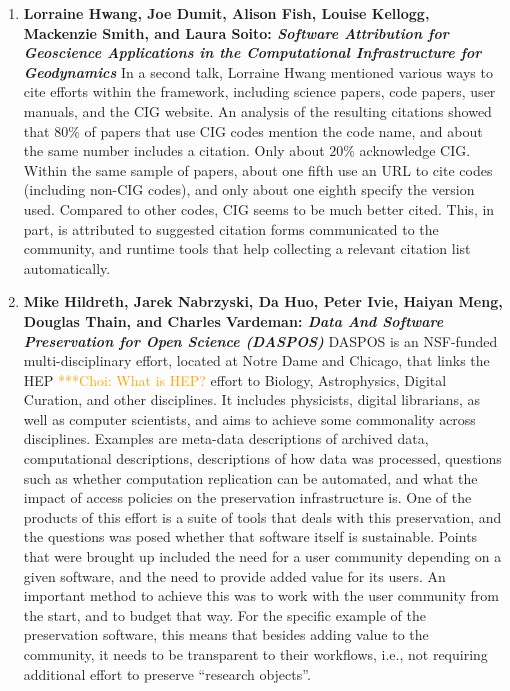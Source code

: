 \documentclass[11pt, oneside]{amsart}
\newcommand{\choinote}[1]{ {\textcolor{orange}    {***Choi: #1 }}}
\begin{document}
\begin{enumerate}
\item \textbf{Lorraine Hwang, Joe Dumit, Alison Fish, Louise Kellogg, Mackenzie
Smith, and Laura Soito: \textit{Software Attribution for Geoscience Applications
in the Computational Infrastructure for Geodynamics}} In a second talk, Lorraine
Hwang mentioned various ways to cite efforts within the framework, including
science papers, code papers, user manuals, and the CIG website. An analysis of the
resulting citations showed that $80\%$ of papers that use CIG codes mention the
code name, and about the same number includes a citation. Only about $20\%$
acknowledge CIG. Within the same sample of papers, about one fifth use an URL to
cite codes (including non-CIG codes), and only about one eighth specify the
version used. Compared to other codes, CIG seems to be much better
cited. This, in part, is attributed to suggested citation forms communicated to
the community, and runtime tools that help collecting a relevant citation list
automatically.

\item \textbf{Mike Hildreth, Jarek Nabrzyski, Da Huo, Peter Ivie, Haiyan Meng,
Douglas Thain, and Charles Vardeman: \textit{Data And Software Preservation for
Open Science (DASPOS)}} DASPOS is an NSF-funded multi-disciplinary effort,
located at Notre Dame and Chicago, that links the HEP \choinote{What is HEP?} effort to Biology,
Astrophysics, Digital Curation, and other disciplines. It includes physicists,
digital librarians, as well as computer scientists, and aims to achieve some
commonality across disciplines. Examples are meta-data descriptions of archived
data, computational descriptions, descriptions of how data was processed, 
questions such as whether computation replication can be
automated, and what the impact of access policies on the preservation
infrastructure is. One of the products of this effort is a suite of tools that
deals with this preservation, and the questions was posed whether that software
itself is sustainable. Points that were brought up included the need for a user
community depending on a given software, and the need to provide added value for
its users. An important method to achieve this was to work with the user
community from the start, and to budget that way. For the specific example of
the preservation software, this means that besides adding value to the
community, it needs to be transparent to their workflows, i.e., not requiring
additional effort to preserve ``research objects''.


\end{enumerate}
\end{document}

